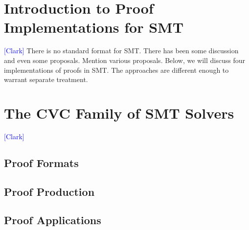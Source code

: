 \documentclass{llncs}
\newcommand{\Note}[1]{\textcolor{blue}{[#1]}}
\begin{document}






\section{Introduction to Proof Implementations for SMT}
\label{sec:format}

\Note{Clark}
There is no standard format for SMT.  There has been some discussion and even
some proposals.  Mention various proposals.  Below, we will discuss four
implementations of proofs in SMT.  The approaches are different enough to
warrant separate treatment.

\section{The CVC Family of SMT Solvers}
\Note{Clark}
\subsection{Proof Formats}
\subsection{Proof Production}
\subsection{Proof Applications}
\end{document}
